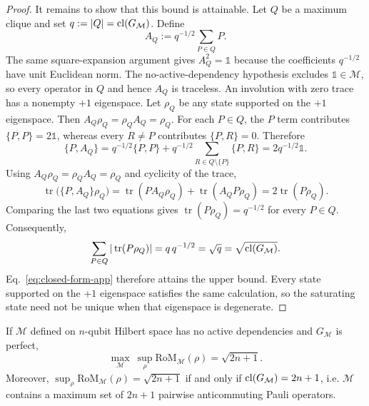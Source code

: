 \documentclass[10pt,aps,pra,twocolumn,floatfix,nofootinbib,superscriptaddress,longbibliography]{revtex4-2}
\newcommand{\Mcal}{\mathcal M}
\newcommand{\RoM}{\mathrm{RoM}}
\renewcommand{\tr}{\operatorname{tr}}
\begin{document}
\begin{bibunit}[apsrev4-2]
\begin{proof}
			It remains to show that this bound is attainable. Let $Q$ be a maximum clique and set $q:=|Q|=\clnum(G_\Mcal)$. Define
			\begin{equation}
				\displaystyle A_Q:=q^{-1/2}\sum_{P\in Q}P.
			\end{equation}
			The same square-expansion argument gives $A_Q^2=\mathbb{1}$ because the coefficients $q^{-1/2}$ have unit Euclidean norm. The no-active-dependency hypothesis excludes $\mathbb{1}\in\Mcal$, so every operator in $Q$ and hence $A_Q$ is traceless. An involution with zero trace has a nonempty $+1$ eigenspace. Let $\rho_Q$ be any state supported on the $+1$ eigenspace. Then $A_Q\rho_Q=\rho_QA_Q=\rho_Q$.
			For each $P\in Q$, the $P$ term contributes $\{P,P\}=2\mathbb{1}$, whereas every $R\neq P$ contributes $\{P,R\}=0$. Therefore
			\begin{equation}
				\displaystyle
				\{P,A_Q\}
				=q^{-1/2}\{P,P\}
				+q^{-1/2}\sum_{R\in Q\setminus\{P\}}\{P,R\}
				=2q^{-1/2}\mathbb{1}.
			\end{equation}
			Using $A_Q\rho_Q=\rho_QA_Q=\rho_Q$ and cyclicity of the trace,
			\begin{equation}
				\displaystyle
				\tr\!\big(\{P,A_Q\}\rho_Q\big)
				=\tr(PA_Q\rho_Q)+\tr(A_QP\rho_Q)
				=2\tr(P\rho_Q).
			\end{equation}
			Comparing the last two equations gives $\tr(P\rho_Q)=q^{-1/2}$ for every $P\in Q$. Consequently,
			\begin{equation}
				\displaystyle
				\sum_{P\in Q}|\tr(P\rho_Q)|
				=q\,q^{-1/2}
				=\sqrt q
				=\sqrt{\clnum(G_\Mcal)}.
			\end{equation}
			Eq.~\eqref{eq:closed-form-app} therefore attains the upper bound. Every state supported on the $+1$ eigenspace satisfies the same calculation, so the saturating state need not be unique when that eigenspace is degenerate.
		\end{proof}
		
		\begin{proposition}
			\label{prop:extremal}
			If $\Mcal$ defined on $n$-qubit Hilbert space has no active dependencies and $G_\Mcal$ is perfect,
			\begin{equation}
				\max_\Mcal\ \sup_\rho\RoM_\Mcal(\rho)=\sqrt{2n+1}.
				\label{eq:extremal}
			\end{equation}
			Moreover, $\sup_\rho\RoM_\Mcal(\rho)=\sqrt{2n+1}$ if and only if $\clnum(G_\Mcal)=2n+1$, i.e. $\Mcal$ contains a maximum set of $2n+1$ pairwise anticommuting Pauli operators.
			

\end{proposition}
\end{bibunit}
\end{document}
